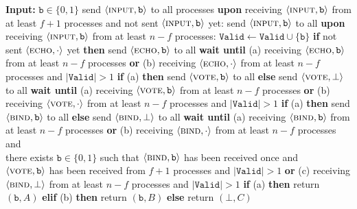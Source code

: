 \begin{algorithm}
    \label{alg:GBCA}
    \caption{Implementation of \textsf{GBCA} from \cite{Abraham2022Efficient}}
    \begin{algorithmic}
        \State \textbf{Input:} $\texttt{b} \in \{0,1\}$
        \medskip
        \State send $\langle \textsc{input}, \texttt{b} \rangle$ to all processes
        \State \textbf{upon} receiving $\langle \textsc{input}, \texttt{b} \rangle$ from at least
        $f + 1$ processes and not sent $\langle \textsc{input}, \texttt{b}\rangle$ yet:
        \State \quad send $\langle \textsc{input}, \texttt{b}\rangle$ to all
        \State \textbf{upon} receiving $\langle \textsc{input}, \texttt{b} \rangle$ from at least
        $n - f$ processes:
        \State \quad $\texttt{Valid} \gets \texttt{Valid} \cup \{\texttt{b}\}$
        \State \quad \textbf{if} not sent $\langle \textsc{echo}, \cdot \rangle$ yet \textbf{then}
        send $\langle \textsc{echo}, \texttt{b}\rangle$ to all
        \State \textbf{wait until}
        \State \quad (a) receiving $\langle \textsc{echo}, \texttt{b} \rangle$ from at least
        $n - f$ processes \textbf{or}
        \State \quad (b) receiving $\langle \textsc{echo}, \cdot \rangle$ from at least $n - f$
        processes and $|\texttt{Valid}| > 1$
        \State \quad \textbf{if} (a) \textbf{then} send $\langle \textsc{vote}, \texttt{b}\rangle$
        to all \textbf{else} send $\langle \textsc{vote}, \bot\rangle$ to all
        \State \textbf{wait until}
        \State \quad (a) receiving $\langle \textsc{vote}, \texttt{b} \rangle$ from at least
        $n - f$ processes \textbf{or}
        \State \quad (b) receiving $\langle \textsc{vote}, \cdot \rangle$ from at least $n - f$
        processes and $|\texttt{Valid}| > 1$
        \State \quad \textbf{if} (a) \textbf{then} send $\langle \textsc{bind}, \texttt{b}\rangle$
        to all \textbf{else} send $\langle \textsc{bind}, \bot\rangle$ to all
        \State \textbf{wait until}
        \State \quad (a) receiving $\langle \textsc{bind}, \texttt{b} \rangle$ from at least
        $n - f$ processes \textbf{or}
        \State \quad (b) receiving $\langle \textsc{bind}, \cdot \rangle$ from at least $n - f$
        processes and \\
        \quad  there exists $\texttt{b} \in \{0,1\}$ such that
        $\langle \textsc{bind}, \texttt{b}\rangle$ has been received once and \\
        \quad $\langle \textsc{vote}, \texttt{b}\rangle$ has been received from $f+1$ processes
        and $|\texttt{Valid}| > 1$ \textbf{or}
        \State \quad (c) receiving $\langle \textsc{bind}, \bot \rangle$ from at least $n - f$
        processes and $|\texttt{Valid}| > 1$
        \State \quad \textbf{if} (a) \textbf{then} return $(\texttt{b},A)$ \textbf{elif} (b)
        \textbf{then} return $(\texttt{b},B)$ \textbf{else} return $(\bot, C)$
    \end{algorithmic}
\end{algorithm}


